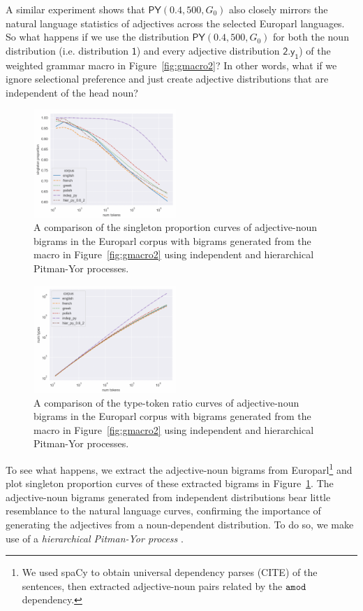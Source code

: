\documentclass[11pt]{article}
\renewcommand{\bnfpn}[1]{\mathsf{#1}}
\begin{document}
A similar experiment shows that $\mathsf{PY}(0.4, 500, G_0)$ also closely mirrors the natural language statistics of adjectives across the selected Europarl languages. So what happens if we use the distribution $\mathsf{PY}(0.4, 500, G_0)$ for both the noun distribution (i.e. distribution $\bnfpn{1}$) and every adjective distribution $\bnfpn{2.y_1}$) of the weighted grammar macro in Figure~\ref{fig:gmacro2}? In other words, what if we ignore selectional preference and just create adjective distributions that are independent of the head noun?

\begin{figure}[t]
\centering
\includegraphics[width=0.48\textwidth]{images/sp3.png}
\caption{A comparison of the singleton proportion curves of adjective-noun bigrams in the Europarl corpus with bigrams generated from the macro in Figure~\ref{fig:gmacro2} using independent and hierarchical Pitman-Yor processes.}
\label{fig:sp3}
\end{figure}

\begin{figure}[t]
\centering
\includegraphics[width=0.48\textwidth]{images/type_token3.png}
\caption{A comparison of the type-token ratio curves of adjective-noun bigrams in the Europarl corpus with bigrams generated from the macro in Figure~\ref{fig:gmacro2} using independent and hierarchical Pitman-Yor processes.}
\label{fig:type_token3}
\end{figure}

To see what happens, we extract the adjective-noun bigrams from Europarl\footnote{We used spaCy to obtain universal dependency parses (CITE) of the sentences, then extracted adjective-noun pairs related by the $\texttt{amod}$ dependency.} and plot singleton proportion curves of these extracted bigrams in Figure~\ref{fig:sp3}. The adjective-noun bigrams generated from independent distributions bear little resemblance to the natural language curves, confirming the importance of generating the adjectives from a noun-dependent distribution. To do so, we make use of a \emph{hierarchical Pitman-Yor process} \cite{teh-2006-hierarchical}.
\end{document}

